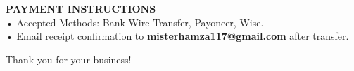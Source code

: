 \documentclass[11pt,a4paper]{article}
\begin{document}

\vspace{3em}

\textbf{PAYMENT INSTRUCTIONS} \\[4pt]
• Accepted Methods: Bank Wire Transfer, Payoneer, Wise. \\
• Email receipt confirmation to \textbf{misterhamza117@gmail.com} after transfer.

\vfill
\begin{center}
    {\color{gray} Thank you for your business!}
\end{center}
\end{document}
